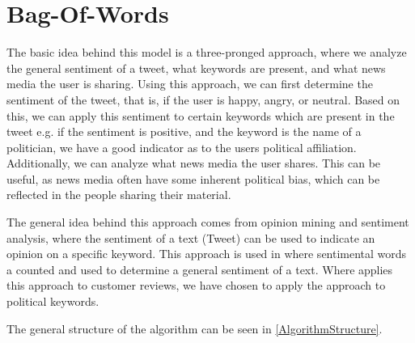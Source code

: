 \section{Bag-Of-Words}\label{sec:BoW}
The basic idea behind this model is a three-pronged approach, where we
analyze the general sentiment of a tweet, what keywords are present, and what
news media the user is sharing. Using this approach, we can first determine the
sentiment of the tweet, that is, if the user is happy, angry, or neutral. Based
on this, we can apply this sentiment to certain keywords which are present in
the tweet e.g. if the sentiment is positive, and the keyword is the name of a
politician, we have a good indicator as to the users political affiliation.
Additionally, we can analyze what news media the user shares. This can be
useful, as news media often have some inherent political bias, which can be
reflected in the people sharing their material\citep{allSidesBias}.\nl 

The general idea behind this approach comes from opinion mining and sentiment
analysis, where the sentiment of a text (Tweet) can be used to indicate an
opinion on a specific keyword. This approach is used in
\citep{sarlan2014twitter} where sentimental words a counted and used to
determine a general sentiment of a text. Where \citep{sarlan2014twitter} applies
this approach to customer reviews, we have chosen to apply the approach to
political keywords.

The general structure of the algorithm can be seen in
\autoref{AlgorithmStructure}.\\


